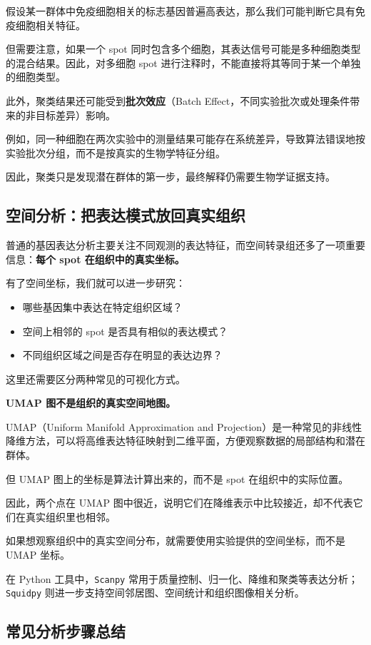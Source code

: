 \documentclass[UTF8,a4paper,11pt,fontset=fandol]{ctexart}
\newcommand{\term}[2]{{\color{accent}\textbf{#1}}（#2）}
\newcommand{\code}[1]{{\color{tealaccent}\texttt{#1}}}
\begin{document}
假设某一群体中免疫细胞相关的标志基因普遍高表达，那么我们可能判断它具有免疫细胞相关特征。

但需要注意，如果一个 spot 同时包含多个细胞，其表达信号可能是多种细胞类型的混合结果。因此，对多细胞 spot 进行注释时，不能直接将其等同于某一个单独的细胞类型。

此外，聚类结果还可能受到\term{批次效应}{Batch Effect，不同实验批次或处理条件带来的非目标差异}影响。

例如，同一种细胞在两次实验中的测量结果可能存在系统差异，导致算法错误地按实验批次分组，而不是按真实的生物学特征分组。

因此，聚类只是发现潜在群体的第一步，最终解释仍需要生物学证据支持。

\subsection{空间分析：把表达模式放回真实组织}

普通的基因表达分析主要关注不同观测的表达特征，而空间转录组还多了一项重要信息：\textbf{每个 spot 在组织中的真实坐标。}

有了空间坐标，我们就可以进一步研究：

\begin{itemize}
  \item 哪些基因集中表达在特定组织区域？
  \item 空间上相邻的 spot 是否具有相似的表达模式？
  \item 不同组织区域之间是否存在明显的表达边界？
\end{itemize}

这里还需要区分两种常见的可视化方式。

\textbf{UMAP 图不是组织的真实空间地图。}

UMAP（Uniform Manifold Approximation and Projection）是一种常见的非线性降维方法，可以将高维表达特征映射到二维平面，方便观察数据的局部结构和潜在群体。

但 UMAP 图上的坐标是算法计算出来的，而不是 spot 在组织中的实际位置。

因此，两个点在 UMAP 图中很近，说明它们在降维表示中比较接近，却不代表它们在真实组织里也相邻。

如果想观察组织中的真实空间分布，就需要使用实验提供的空间坐标，而不是 UMAP 坐标。

在 Python 工具中，\code{Scanpy} 常用于质量控制、归一化、降维和聚类等表达分析；\code{Squidpy} 则进一步支持空间邻居图、空间统计和组织图像相关分析。\cite{scanpy,squidpy}

\subsection{常见分析步骤总结}
\end{document}
